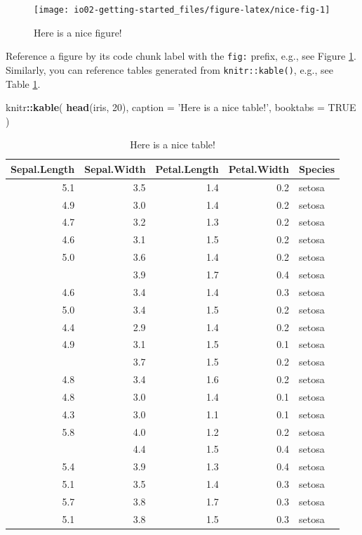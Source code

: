 \documentclass[
]{book}
\newenvironment{Shaded}{\begin{snugshade}}{\end{snugshade}}
\newcommand{\DataTypeTok}[1]{\textcolor[rgb]{0.13,0.29,0.53}{#1}}
\newcommand{\DecValTok}[1]{\textcolor[rgb]{0.00,0.00,0.81}{#1}}
\newcommand{\KeywordTok}[1]{\textcolor[rgb]{0.13,0.29,0.53}{\textbf{#1}}}
\newcommand{\NormalTok}[1]{#1}
\newcommand{\OperatorTok}[1]{\textcolor[rgb]{0.81,0.36,0.00}{\textbf{#1}}}
\newcommand{\OtherTok}[1]{\textcolor[rgb]{0.56,0.35,0.01}{#1}}
\newcommand{\StringTok}[1]{\textcolor[rgb]{0.31,0.60,0.02}{#1}}
\begin{document}
\begin{figure}

{\centering \texttt{[image: io02-getting-started\_files/figure-latex/nice-fig-1]} 

}

\caption{Here is a nice figure!}\label{fig:nice-fig}
\end{figure}

Reference a figure by its code chunk label with the \texttt{fig:} prefix, e.g., see Figure \ref{fig:nice-fig}. Similarly, you can reference tables generated from \texttt{knitr::kable()}, e.g., see Table \ref{tab:nice-tab}.

\begin{Shaded}
\begin{Highlighting}[]
\NormalTok{knitr}\OperatorTok{::}\KeywordTok{kable}\NormalTok{(}
  \KeywordTok{head}\NormalTok{(iris, }\DecValTok{20}\NormalTok{), }\DataTypeTok{caption =} \StringTok{'Here is a nice table!'}\NormalTok{,}
  \DataTypeTok{booktabs =} \OtherTok{TRUE}
\NormalTok{)}
\end{Highlighting}
\end{Shaded}

\begin{table}

\caption{\label{tab:nice-tab}Here is a nice table!}
\centering
\begin{tabular}[t]{rrrrl}
\toprule
Sepal.Length & Sepal.Width & Petal.Length & Petal.Width & Species\\
\midrule
5.1 & 3.5 & 1.4 & 0.2 & setosa\\
4.9 & 3.0 & 1.4 & 0.2 & setosa\\
4.7 & 3.2 & 1.3 & 0.2 & setosa\\
4.6 & 3.1 & 1.5 & 0.2 & setosa\\
5.0 & 3.6 & 1.4 & 0.2 & setosa\\
\addlinespace
5.4 & 3.9 & 1.7 & 0.4 & setosa\\
4.6 & 3.4 & 1.4 & 0.3 & setosa\\
5.0 & 3.4 & 1.5 & 0.2 & setosa\\
4.4 & 2.9 & 1.4 & 0.2 & setosa\\
4.9 & 3.1 & 1.5 & 0.1 & setosa\\
\addlinespace
5.4 & 3.7 & 1.5 & 0.2 & setosa\\
4.8 & 3.4 & 1.6 & 0.2 & setosa\\
4.8 & 3.0 & 1.4 & 0.1 & setosa\\
4.3 & 3.0 & 1.1 & 0.1 & setosa\\
5.8 & 4.0 & 1.2 & 0.2 & setosa\\
\addlinespace
5.7 & 4.4 & 1.5 & 0.4 & setosa\\
5.4 & 3.9 & 1.3 & 0.4 & setosa\\
5.1 & 3.5 & 1.4 & 0.3 & setosa\\
5.7 & 3.8 & 1.7 & 0.3 & setosa\\
5.1 & 3.8 & 1.5 & 0.3 & setosa\\
\bottomrule
\end{tabular}
\end{table}
\end{document}
